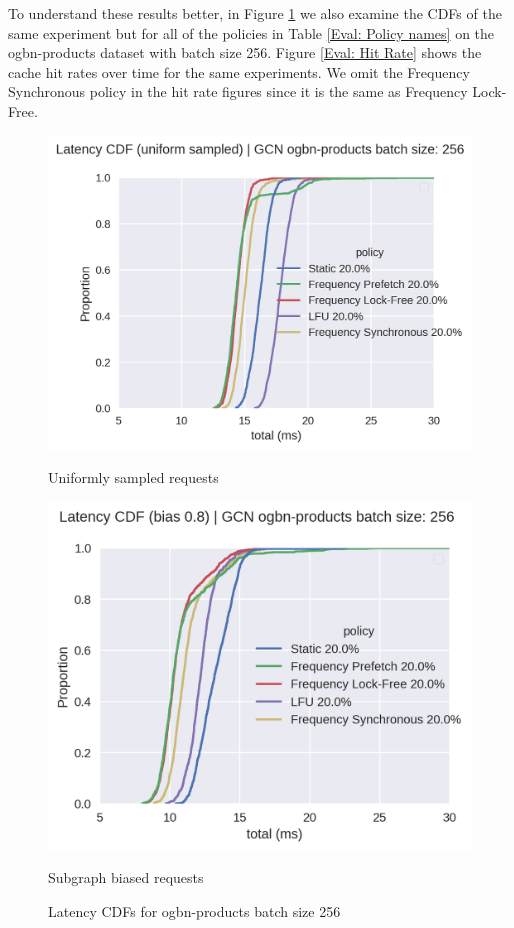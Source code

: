 To understand these results better, in Figure \ref{Eval: Latency CDF} we also examine the CDFs of the same experiment but for all of the policies in Table \ref{Eval: Policy names} on the ogbn-products dataset with batch size 256. Figure \ref{Eval: Hit Rate} shows the cache hit rates over time for the same experiments. We omit the Frequency Synchronous policy in the hit rate figures since it is the same as Frequency Lock-Free.

\begin{figure}[h!]
    \centering
    \begin{minipage}[c]{0.48\textwidth}
        \centering
        \includegraphics[width=\textwidth]{figures/CDF_GCN_uniform_pinnedc0.2.png}
        \caption*{Uniformly sampled requests}
    \end{minipage}
    \hfill
    \begin{minipage}[c]{0.48\textwidth}
        \centering
        \includegraphics[width=\textwidth]{figures/CDF_GCN_bias_pinnedc0.2.png}    
        \caption*{Subgraph biased requests}
    \end{minipage}
    \caption{Latency CDFs for ogbn-products batch size 256}
    \label{Eval: Latency CDF}
\end{figure}    

